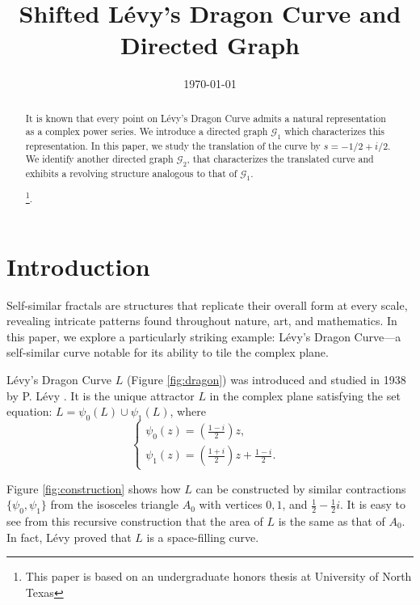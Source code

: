 \documentclass[epsf,10pt]{article}
\title{Shifted L\'evy's Dragon Curve and Directed Graph}
\author{Jonathan Leung \\University of North Texas \footnote{\address}}
\date{\today}
\newcommand\GG{\mathcal{G}}
\begin{document}
\maketitle

\renewcommand{\thefootnote}{\ }
\begin{abstract}

It is known that every point on L\'evy’s Dragon Curve admits a natural representation as a complex power series. We introduce a directed graph $\GG_1$ which characterizes this representation.
In this paper, we study the translation of the curve by $s=-1/2+i/2$. 
We identify another directed graph $\GG_2$, that characterizes the translated curve and exhibits a revolving structure analogous to that of $\GG_1$. 

\footnote{This paper is based on an undergraduate honors thesis at University of North Texas}.

\end{abstract}


\section{Introduction}

Self-similar fractals are structures that replicate their overall form at every scale, revealing intricate patterns found throughout nature, art, and mathematics. In this paper, we explore a particularly striking example: Lévy’s Dragon Curve—a self-similar curve notable for its ability to tile the complex plane. 

L\'evy's Dragon Curve $L$ (Figure \ref{fig:dragon}) was introduced and studied in 1938 by P. L\'evy \cite{Levy-1938}. It is the unique attractor $L$ in the complex plane satisfying the set equation: $L=\psi_0(L)\cup\psi_1(L)$,
where
\begin{equation}
\label{eq:levy}
\begin{cases}
 \psi_0(z)=(\frac{1-i}{2})z,& \\
 \psi_1(z)=(\frac{1+i}{2})z + \frac{1-i}{2}. &
\end{cases}
\end{equation}

Figure \ref{fig:construction} shows how $L$ can be constructed by similar contractions $\{\psi_0, \psi_1 \}$ from the isosceles triangle $A_0$ with vertices $0,1$, and $\tfrac12-\tfrac12 i$. It is easy to see from this recursive construction that the area of $L$ is the same as that of $A_0$. In fact, L\'evy proved that $L$ is a space-filling curve. 
\end{document}
